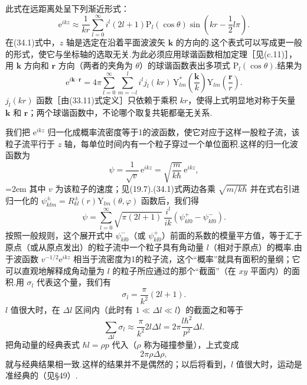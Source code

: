 此式在远距离处呈下列渐近形式：
\begin{equation}
  \mathrm{e}^{ikz}\approx\frac{1}{kr}\sum_{l=0}^{\infty}i^l(2l+1)
  \mathrm{P}_l(\cos\theta)\sin\left(kr-\frac{1}{2}l\pi\right).
\end{equation}
在(34.1)式中，$z$ 轴是选定在沿着平面波波矢 $\boldsymbol{k}$ 的方向的.这个表式可以写成更一般的形式，使它与坐标轴的选取无关.为此必须应用球谐函数相加定理［见(c.11)］，用 $\boldsymbol{k}$ 方向和 $\boldsymbol{r}$ 方向（两者的夹角为 $\theta$）的球谐函数表出多项式 $\mathrm{P}_l(\cos\theta)$.结果为
\begin{equation}
  \mathrm{e}^{i\boldsymbol{k}\cdot\boldsymbol{r}}=4\pi\sum_{l=0}^{\infty}\sum_{m=-l}^{l}
  i^lj_l(kr)\,\mathrm{Y}^*_{lm}\left(\frac{\boldsymbol{k}}{k}\right)
  \mathrm{Y}_{lm}\left(\frac{\boldsymbol{r}}{r}\right).
\end{equation}
$j_l(kr)$ 函数［由(33.11)式定义］只依赖于乘积 $kr$，使得上式明显地对称于矢量 $\boldsymbol{k}$ 和 $\boldsymbol{r}$；两个球谐函数中，不论哪个取复共轭都毫无关系.

我们把 $\mathrm{e}^{ikz}$ 归一化成概率流密度等于1的波函数，使它对应于这样一股粒子流，该粒子流平行于 $z$ 轴，每单位时间内有一个粒子穿过一个单位面积.这样的归一化波函数为
\begin{equation}
  \psi=\frac{1}{\sqrt{v}}\,\mathrm{e}^{ikz}
  =\sqrt{\frac{m}{k\hbar}}\,\mathrm{e}^{ikz},
\end{equation}
\emergencystretch=2em%
其中 $v$ 为该粒子的速度；见(19.7).(34.1)式两边各乘 $\sqrt{m/k\hbar}$ 并在式右引进归一化的 $\psi^{\pm}_{klm}=R^{\pm}_{kl}(r)\mathrm{Y}_{lm}(\theta,\varphi)$ 函数后，我们得
\begin{equation*}
  \psi=\sum_{l=0}^{\infty}\sqrt{\pi(2l+1)}\,\frac{i^l}{ik}
  \left(\psi^+_{kl0}-\psi^-_{kl0}\right).
\end{equation*}
\emergencystretch=0pt%
按照一般规则，这个展开式中 $\psi^-_{kl0}$（或 $\psi^+_{kl0}$）前面的系数的模量平方值，等于汇于原点（或从原点发出）的粒子流中一个粒子具有角动量 $l$（相对于原点）的概率.由于波函数 $v^{-1/2}\mathrm{e}^{ikz}$ 相当于流密度为1的粒子流，这个“概率”就具有面积的量纲；它可以直观地解释成角动量为 $l$ 的粒子所应通过的那个“截面”（在 $xy$ 平面内）的面积.用 $\sigma_l$ 代表这个量，我们有
\begin{equation}
  \sigma_l=\frac{\pi}{k^2}(2l+1).
\end{equation}
$l$ 值很大时，在 $\Delta l$ 区间内（此时有 $1\ll\Delta l\ll l$）的截面之和等于
\begin{equation*}
  \sum_{\Delta l}\sigma_l\approx\frac{\pi}{k^2}2l\Delta l
  =2\pi\frac{l\hbar^2}{p^2}\Delta l.
\end{equation*}
把角动量的经典表式 $\hbar l=\rho p$ 代入（$\rho$ 称为碰撞参量），上式变成
\begin{equation*}
  2\pi\rho\Delta\rho,
\end{equation*}
就与经典结果相一致.这样的结果并不是偶然的；以后将看到，$l$ 值很大时，运动是准经典的（见§49）.

